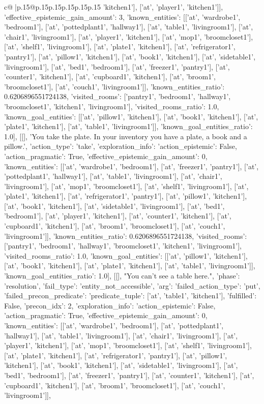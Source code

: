\documentclass{article}
\begin{document}
{\begin{supertabular}{c@{$\;$}|p{.15\linewidth}@{}p{.15\linewidth}p{.15\linewidth}p{.15\linewidth}p{.15\linewidth}p{.15\linewidth}}
{{{'kitchen1'], ['at', 'player1', 'kitchen1']], 'effective_epistemic_gain_amount': 3, 'known_entities': [['at', 'wardrobe1', 'bedroom1'], ['at', 'pottedplant1', 'hallway1'], ['at', 'table1', 'livingroom1'], ['at', 'chair1', 'livingroom1'], ['at', 'player1', 'kitchen1'], ['at', 'mop1', 'broomcloset1'], ['at', 'shelf1', 'livingroom1'], ['at', 'plate1', 'kitchen1'], ['at', 'refrigerator1', 'pantry1'], ['at', 'pillow1', 'kitchen1'], ['at', 'book1', 'kitchen1'], ['at', 'sidetable1', 'livingroom1'], ['at', 'bed1', 'bedroom1'], ['at', 'freezer1', 'pantry1'], ['at', 'counter1', 'kitchen1'], ['at', 'cupboard1', 'kitchen1'], ['at', 'broom1', 'broomcloset1'], ['at', 'couch1', 'livingroom1']], 'known_entities_ratio': 0.6206896551724138, 'visited_rooms': ['pantry1', 'bedroom1', 'hallway1', 'broomcloset1', 'kitchen1', 'livingroom1'], 'visited_rooms_ratio': 1.0, 'known_goal_entities': [['at', 'pillow1', 'kitchen1'], ['at', 'book1', 'kitchen1'], ['at', 'plate1', 'kitchen1'], ['at', 'table1', 'livingroom1']], 'known_goal_entities_ratio': 1.0}}], [[], 'You take the plate. In your inventory you have a plate, a book and a pillow.', {'action_type': 'take', 'exploration_info': {'action_epistemic': False, 'action_pragmatic': True, 'effective_epistemic_gain_amount': 0, 'known_entities': [['at', 'wardrobe1', 'bedroom1'], ['at', 'freezer1', 'pantry1'], ['at', 'pottedplant1', 'hallway1'], ['at', 'table1', 'livingroom1'], ['at', 'chair1', 'livingroom1'], ['at', 'mop1', 'broomcloset1'], ['at', 'shelf1', 'livingroom1'], ['at', 'plate1', 'kitchen1'], ['at', 'refrigerator1', 'pantry1'], ['at', 'pillow1', 'kitchen1'], ['at', 'book1', 'kitchen1'], ['at', 'sidetable1', 'livingroom1'], ['at', 'bed1', 'bedroom1'], ['at', 'player1', 'kitchen1'], ['at', 'counter1', 'kitchen1'], ['at', 'cupboard1', 'kitchen1'], ['at', 'broom1', 'broomcloset1'], ['at', 'couch1', 'livingroom1']], 'known_entities_ratio': 0.6206896551724138, 'visited_rooms': ['pantry1', 'bedroom1', 'hallway1', 'broomcloset1', 'kitchen1', 'livingroom1'], 'visited_rooms_ratio': 1.0, 'known_goal_entities': [['at', 'pillow1', 'kitchen1'], ['at', 'book1', 'kitchen1'], ['at', 'plate1', 'kitchen1'], ['at', 'table1', 'livingroom1']], 'known_goal_entities_ratio': 1.0}}], [[], "You can't see a table here.", {'phase': 'resolution', 'fail_type': 'entity_not_accessible', 'arg': {'failed_action_type': 'put', 'failed_precon_predicate': {'predicate_tuple': ['at', 'table1', 'kitchen1'], 'fulfilled': False, 'precon_idx': 2}}, 'exploration_info': {'action_epistemic': False, 'action_pragmatic': True, 'effective_epistemic_gain_amount': 0, 'known_entities': [['at', 'wardrobe1', 'bedroom1'], ['at', 'pottedplant1', 'hallway1'], ['at', 'table1', 'livingroom1'], ['at', 'chair1', 'livingroom1'], ['at', 'player1', 'kitchen1'], ['at', 'mop1', 'broomcloset1'], ['at', 'shelf1', 'livingroom1'], ['at', 'plate1', 'kitchen1'], ['at', 'refrigerator1', 'pantry1'], ['at', 'pillow1', 'kitchen1'], ['at', 'book1', 'kitchen1'], ['at', 'sidetable1', 'livingroom1'], ['at', 'bed1', 'bedroom1'], ['at', 'freezer1', 'pantry1'], ['at', 'counter1', 'kitchen1'], ['at', 'cupboard1', 'kitchen1'], ['at', 'broom1', 'broomcloset1'], ['at', 'couch1', 'livingroom1']], }}}
\end{supertabular}}
\end{document}

